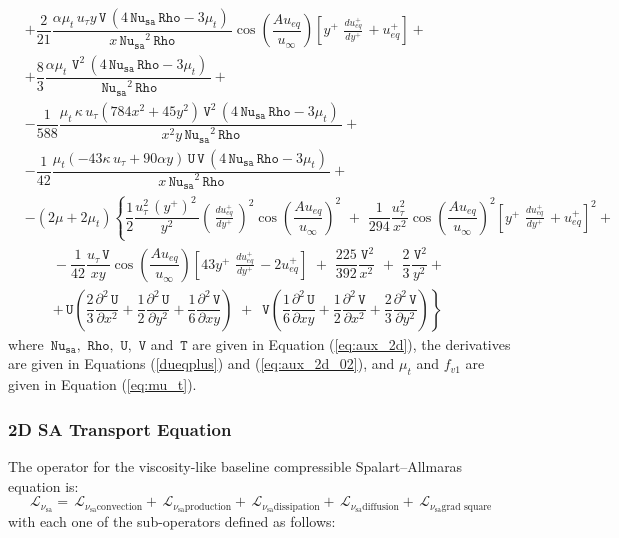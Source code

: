 \documentclass[10pt]{article}
\newcommand{\diff}[2] {\dfrac{\partial #1}{\partial #2}}
\newcommand{\Rho}{\,\mathtt{Rho}}
\newcommand{\U}{\,\mathtt{U}}
\newcommand{\V}{\,\mathtt{V}}
\newcommand{\Nu}{\,\mathtt{Nu_{sa}}}
\newcommand{\T}{\,\mathtt{T}}
\newcommand{\Lo}{\,\mathcal{L}}
\newcommand{\Dueqplusyplus}{\, \frac{du_{eq}^+}{dy^+}\,}
\newcommand{\sa}{\nu_{\mathrm{sa}}}
\begin{document}
\begin{equation*}
\begin{split}
  &+\dfrac{2}{21} \dfrac{ \alpha \mu_t \, u_{\tau} y \V \, (4 \Nu \Rho-3 \mu_t) \,}{x \Nu^2 \Rho} \cos\left(\dfrac{A u_{eq}}{u_{\infty}}\right)\left[y^{+} \, \Dueqplusyplus+u_{eq}^{+} \right]+\\
  &+\dfrac{8}{3} \dfrac{ \alpha \mu_t \, \V^2\, (4 \Nu \Rho-3 \mu_t) \,}{\Nu^2 \Rho}+\\
  &-\dfrac{1}{588} \dfrac{  \mu_t \, \kappa \,  u_{\tau}  (784 x^2+45 y^2)\V^2\, (4 \Nu \Rho-3 \mu_t) \,}{x^2 y \Nu^2 \Rho}+\\
  &-\dfrac{1}{42}  \dfrac{ \mu_t(-43 \kappa \,  u_{\tau}+90 \alpha y) \U \V  \, (4 \Nu \Rho-3 \mu_t) \,}{x \Nu^2 \Rho}+\\
%
&- (2 \mu+2 \mu_t) \left\{\dfrac{1}{2}  \dfrac{u_{\tau}^2 \, (y^{+})^2 \,  }{y^2} \left(\Dueqplusyplus\right)^2 \cos\left(\dfrac{A u_{eq}}{u_{\infty}}\right)^2\,\, +\,\,\dfrac{1}{294}\dfrac{u_{\tau}^2 \, }{x^2} \cos\left(\dfrac{A u_{eq}}{u_{\infty}}\right)^2\left[y^{+} \, \Dueqplusyplus+u_{eq}^{+} \right]^2  +\right.\\
  &\qquad-\dfrac{1}{42}\dfrac{ u_{\tau} \V}{x y} \cos\left(\dfrac{A u_{eq}}{u_{\infty}}\right) \left[43 y^{+} \, \Dueqplusyplus-2 u_{eq}^{+}\right]\,\, +\,\,\dfrac{225}{392} \dfrac{\V^2}{x^2}\,\,+\,\, \dfrac{2}{3} \dfrac{\V^2}{y^2} +\\
  &\qquad\left.+ \U \left(\dfrac{2}{3} \diff{^2 \U}{x^2}+\dfrac{1}{2}  \diff{^2 \U}{y^2}+\dfrac{1}{6} \diff{^2 \V}{xy}\right) \,\, + \,\, \V \left(\dfrac{1}{6} \diff{^2 \U}{xy}+\dfrac{1}{2}  \diff{^2 \V}{x^2}+\dfrac{2}{3} \diff{^2 \V}{y^2}\right) \right\}
 \end{split}
\end{equation*}
%
where  $\Nu,\,\Rho,\,\U,\,\V$ and $\T$ are given in Equation (\ref{eq:aux_2d}), the derivatives are given in Equations (\ref{dueqplus}) and (\ref{eq:aux_2d_02}), and $\mu_t$ and $f_{v1}$ are given in  Equation (\ref{eq:mu_t}).



\subsubsection{2D SA Transport Equation}

The operator for the viscosity-like baseline compressible Spalart--Allmaras equation is:
 $$\Lo_{\sa }=\Lo_{\sa \text{convection}} +  \Lo_{\sa \text{production}} +  \Lo_{\sa \text{dissipation}}+  \Lo_{\sa \text{diffusion}}  +  \Lo_{\sa \text{grad square}}$$
with each one of the sub-operators defined as follows:
\end{document}
